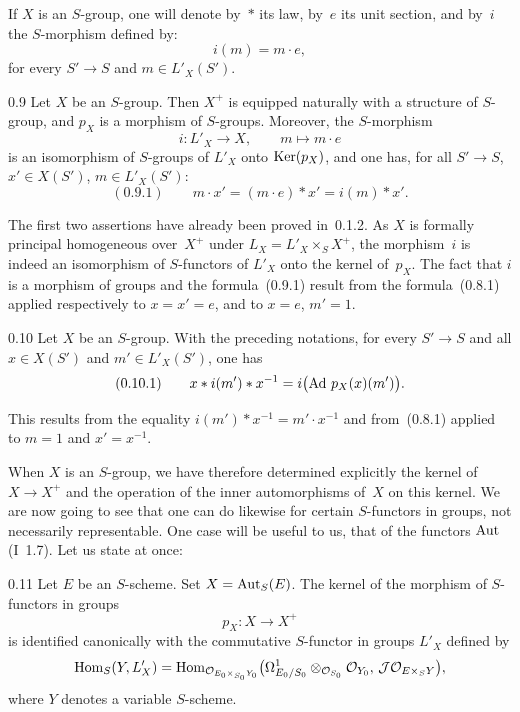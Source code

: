 If \(X\) is an \(S\)-group, one will denote by~\(*\) its law, by~\(e\) its unit
section, and by~\(i\) the \(S\)-morphism defined by:
\[
i(m)=m\cdot e,
\]
for every \(S'\to S\) and \(m\in L'_{X}(S')\).

\begin{corollary}{0.9}
\label{III.0.9}
Let \(X\) be an \(S\)-group. Then \(X^{+}\) is equipped naturally with a
structure of \(S\)-group, and \(p_{X}\) is a morphism of \(S\)-groups.
Moreover, the \(S\)-morphism
\[
i\colon L'_{X}\to X,\qquad m\mapsto m\cdot e
\]
is an isomorphism of \(S\)-groups of \(L'_{X}\) onto \(\operatorname{Ker}(p_{X})\), and one
has, for all \(S'\to S\), \(x'\in X(S')\), \(m\in L'_{X}(S')\):
\begin{equation*}
(0.9.1)\qquad
m\cdot x'=(m\cdot e)*x'=i(m)*x'.
\end{equation*}
\end{corollary}

The first two assertions have already been proved in~0.1.2. As \(X\) is
formally principal homogeneous over~\(X^{+}\) under
\(L_{X}=L'_{X}\times_{S}X^{+}\), the morphism~\(i\) is indeed an isomorphism
of \(S\)-functors of \(L'_{X}\) onto the kernel of~\(p_{X}\). The fact that
\(i\) is a morphism of groups and the formula~(0.9.1) result from the
formula~(0.8.1) applied respectively to \(x=x'=e\), and to \(x=e\), \(m'=1\).

\begin{corollary}{0.10}
\label{III.0.10}
Let \(X\) be an \(S\)-group. With the preceding notations, for every \(S'\to S\)
and all \(x\in X(S')\) and \(m'\in L'_{X}(S')\), one has
\begin{equation*}
(0.10.1)\qquad
x*i(m')*x^{-1}
=
i\bigl(\operatorname{Ad}\,p_{X}(x)(m')\bigr).
\end{equation*}
\end{corollary}

This results from the equality \(i(m')*x^{-1}=m'\cdot x^{-1}\) and
from~(0.8.1) applied to \(m=1\) and \(x'=x^{-1}\).

When \(X\) is an \(S\)-group, we have therefore determined explicitly the
kernel of \(X\to X^{+}\) and the operation of the inner automorphisms of~\(X\)
on this kernel. We are now going to see that one can do likewise for certain
\(S\)-functors in groups, not necessarily representable. One case will be
useful to us, that of the functors \(\operatorname{Aut}\) (I~1.7).
Let us state at once:

\begin{proposition}{0.11}
\label{III.0.11}
Let \(E\) be an \(S\)-scheme. Set \(X=\operatorname{Aut}_{S}(E)\). The kernel of
the morphism of \(S\)-functors in groups
\[
p_{X}\colon X\to X^{+}
\]
is identified canonically with the commutative \(S\)-functor in groups
\(L'_{X}\) defined by
\[
\operatorname{Hom}_{S}(Y,L'_{X})
=
\operatorname{Hom}_{\mathcal{O}_{E_{0}\times_{S_{0}}Y_{0}}}
  \bigl(\Omega^{1}_{E_{0}/S_{0}}\otimes_{\mathcal{O}_{S_{0}}}\mathcal{O}_{Y_{0}},\,
  \mathcal{J}\mathcal{O}_{E\times_{S}Y}\bigr),
\]
where \(Y\) denotes a variable \(S\)-scheme.
\end{proposition}

